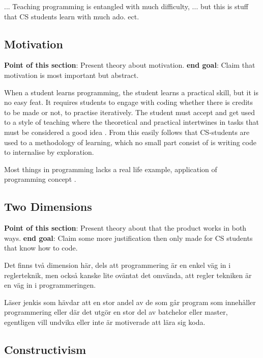 ...
Teaching programming is entangled with much difficulty, ... but this is stuff that CS students learn with much ado. ect.%




\subsection{Motivation}

\textbf{Point of this section}: Present theory about motivation.
\textbf{end goal}: Claim that motivation is most important but abstract.
\newline

When a student learns programming, the student learns a practical skill, but it is no easy feat. It requires students to engage with coding whether there is credits to be made or not, \cite{jenkins_2001} to practise iteratively. The student must accept and get used to a style of teaching where the theoretical and practical intertwines in tasks that must be considered a good idea \cite{jenkins_2001}. From this easily follows that CS-students are used to a methodology of learning, which no small part consist of is writing code to internalise by exploration.

Most things in programming lacks a real life example, application of programming concept \cite{dunican_2002}.

\subsection{Two Dimensions}

\textbf{Point of this section}: Present theory about that the product works in both ways.
\textbf{end goal}: Claim some more justification then only made for CS students that know how to code.
\newline

Det finns två dimension här, dels att programmering är en enkel väg in i reglerteknik, men också kanske lite oväntat det omvända, att regler tekniken är en väg in i programmeringen. 

Läser jenkis som hävdar att en stor andel av de som går program som innehåller programmering eller där det utgör en stor del av batchelor eller master, egentligen vill undvika eller inte är motiverade att lära sig koda. \cite{jenkins_2001}

\subsection{Constructivism}

